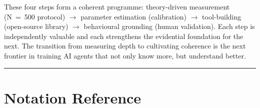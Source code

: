 \documentclass[10pt]{article}
\begin{document}
These four steps form a coherent programme: theory-driven measurement
(N~=~500 protocol) $\rightarrow$ parameter estimation (calibration)
$\rightarrow$ tool-building (open-source library) $\rightarrow$
behavioural grounding (human validation). Each step is independently
valuable and each strengthens the evidential foundation for the next.
The transition from measuring depth to cultivating coherence is the next
frontier in training AI agents that not only know more, but understand
better.

\noindent\rule{\linewidth}{0.4pt}

\small



\appendix
\clearpage
\section{Notation Reference}\label{app:notation}
\end{document}
